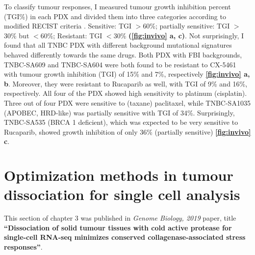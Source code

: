 To classify tumour responses, I measured tumour growth inhibition percent (TGI\%) in each PDX and divided them into three categories according to modified RECIST criteria \cite{aykan2020objective}. Sensitive: \ac{TGI} $>$60\%; partially sensitive: \ac{TGI} $>$30\% but $<$60\%; Resistant: \ac{TGI} $<$30\% \textbf{(\autoref{fig:invivo} a, c)}.
Not surprisingly, I found that all TNBC PDX with different background mutational signatures behaved differently towards the same drugs. Both PDX with FBI backgrounds, TNBC-SA609 and TNBC-SA604 were both found to be resistant to CX-5461 with tumour growth inhibition (TGI) of 15\% and 7\%, respectively \textbf{\autoref{fig:invivo} a, b}. Moreover, they were resistant to Rucaparib as well, with \ac{TGI} of 9\% and 16\%, respectively.
All four of the PDX showed high sensitivity to platinum (cisplatin). Three out of four PDX were sensitive to (taxane) paclitaxel, while TNBC-SA1035 (APOBEC, HRD-like) was partially sensitive with \ac{TGI} of 34\%. Surprisingly, TNBC-SA535 (BRCA 1 deficient), which was expected to be very sensitive to Rucaparib, showed growth inhibition of only 36\%  (partially sensitive) \textbf{\autoref{fig:invivo} c}.


\section{Optimization methods in tumour dissociation for single cell analysis}

This section of chapter 3 was published in \textit{Genome Biology, 2019} paper, title  \textbf{``Dissociation of solid tumour tissues with cold active protease for single-cell RNA-seq minimizes conserved collagenase-associated stress responses''}.

